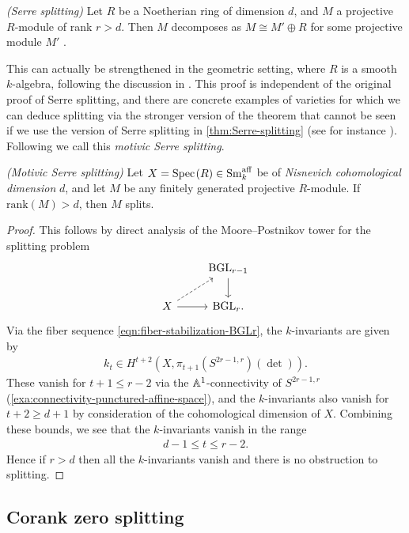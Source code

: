 \documentclass[11pt,openany]{book}
\providecommand{\aff}{\mathrm{aff}}
\begin{document}
\begin{theorem}\label{thm:Serre-splitting} 
\textit{(Serre splitting)} Let $R$ be a Noetherian ring of dimension $d$, and $M$ a projective $R$-module of rank $r > d$. Then $M$ decomposes as $M \cong M' \oplus R$ for some projective module $M'$ \cite[Theorem~1]{Serre-dubreil58}.
\end{theorem}

This can actually be strengthened in the geometric setting, where $R$ is a smooth $k$-algebra, following the discussion in \cite[4.2.1]{AF-survey}. This proof is independent of the original proof of Serre splitting, and there are concrete examples of varieties for which we can deduce splitting via the stronger version of the theorem that cannot be seen if we use the version of Serre splitting in \autoref{thm:Serre-splitting} (see for instance \cite[3.3.6,~3.5.4]{AF-survey}). Following \cite[Theorem~1]{AF-survey} we call this \textit{motivic Serre splitting}.

\begin{theorem} \textit{(Motivic Serre splitting)} Let $X = \Spec(R)\in \Sm_k^\aff$ be of \textit{Nisnevich cohomological dimension} $d$, and let $M$ be any finitely generated projective $R$-module. If $\text{rank}(M) > d$, then $M$ splits.
\end{theorem}
\begin{proof} This follows by direct analysis of the Moore--Postnikov tower for the splitting problem
\[ \begin{tikzcd}
     & \BGL_{r-1}\dar\\
    X\rar\ar[ur,dashed] & \BGL_r.
\end{tikzcd} \]
Via the fiber sequence \autoref{eqn:fiber-stabilization-BGLr}, the $k$-invariants are given by
\begin{align*}
    k_t \in H^{t+2}(X, \pi_{t+1}(S^{2r-1,r})(\det)).
\end{align*}
These vanish for $t+1\le r-2$ via the $\mathbb{A}^1$-connectivity of $S^{2r-1,r}$ (\autoref{exa:connectivity-punctured-affine-space}), and the $k$-invariants also vanish for $t+2 \ge d+1$ by consideration of the cohomological dimension of $X$. Combining these bounds, we see that the $k$-invariants vanish in the range
\begin{align*}
    d-1 \le t \le r-2.
\end{align*}
Hence if $r>d$ then all the $k$-invariants vanish and there is no obstruction to splitting.
\end{proof}

\subsection{Corank zero splitting}
\end{document}
